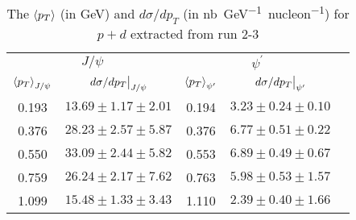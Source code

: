 \documentclass[../main.tex]{subfiles}
\begin{document}
\begin{table}[h!]
	\centering
	\caption{The $\expval{p_T}$ (in \unit{\GeV}) and  $d\sigma/dp_T$ (in \unit{\nano\barn\GeV^{-1} nucleon^{-1}}) for $p+d$ extracted from run 2-3}
	\begin{tabular}{cc|ccc}
		\hline
		\multicolumn{2}{c|}{$J/\psi$} & \multicolumn{2}{c}{$\psi^{\prime}$} &                                                                      \\ \cline{1-4}
		$\expval{p_T}_{J/\psi}$       & $\eval{d\sigma/dp_T}_{J/\psi}$      & $\expval{p_T}_{\psi^\prime}$ & $\eval{d\sigma/dp_T}_{\psi^\prime}$ & \\ \cline{1-4}
		\multicolumn{1}{c|}{0.193}    & $13.69\pm1.17\pm2.01$               & \multicolumn{1}{c|}{0.194}   & $3.23\pm0.24\pm0.10$                & \\
		\multicolumn{1}{c|}{0.376}    & $28.23\pm2.57\pm5.87$               & \multicolumn{1}{c|}{0.376}   & $6.77\pm0.51\pm0.22$                & \\
		\multicolumn{1}{c|}{0.550}    & $33.09\pm2.44\pm5.82$               & \multicolumn{1}{c|}{0.553}   & $6.89\pm0.49\pm0.67$                & \\
		\multicolumn{1}{c|}{0.759}    & $26.24\pm2.17\pm7.62$               & \multicolumn{1}{c|}{0.763}   & $5.98\pm0.53\pm1.57$                & \\
		\multicolumn{1}{c|}{1.099}    & $15.48\pm1.33\pm3.43$               & \multicolumn{1}{c|}{1.110}   & $2.39\pm0.40\pm1.66$                & \\ \cline{1-4}
	\end{tabular}
\end{table}
\end{document}
